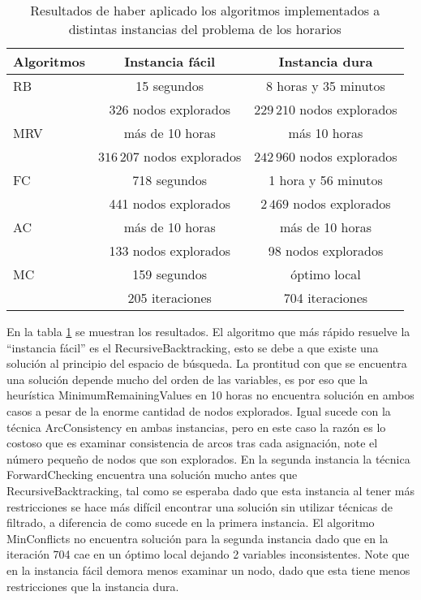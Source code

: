 \begin{table}[h]
	\caption{Resultados de haber aplicado los algoritmos implementados a distintas instancias del problema de los horarios}
	\begin{center}
		\label{1semana}
		\begin{tabular}{|l|c|c||}
			\hline \hline
			Algoritmos & Instancia f\'acil & Instancia dura \\ \hline
			RB & 15 segundos & 8 horas y 35 minutos \\
			 & 326 nodos explorados & $229\,210$ nodos explorados \\ \hline
			MRV & m\'as de 10 horas &  m\'as 10 horas \\
			 & $316\,207$ nodos explorados & $242\,960$ nodos explorados \\ \hline
			FC & 718 segundos & 1 hora y 56 minutos \\
			 & 441 nodos explorados & $2\,469$ nodos explorados \\ \hline
			AC & m\'as de 10 horas &  m\'as de 10 horas \\
			 & 133 nodos explorados & 98 nodos explorados \\ \hline
			MC & 159 segundos & \'optimo local \\
			 & 205 iteraciones & 704 iteraciones \\ \hline
		\end{tabular}
	\end{center}
\end{table}

En la tabla \ref{1semana} se muestran los resultados. El algoritmo que m\'as r\'apido resuelve la ``instancia f\'acil'' es el \textsf{RecursiveBacktracking}, esto se debe a que existe una soluci\'on al principio del espacio de b\'usqueda. La prontitud con que se encuentra una soluci\'on depende mucho del orden de las variables, es por eso que la heur\'istica \textsf{MinimumRemainingValues} en 10 horas no encuentra soluci\'on en ambos casos a pesar de la enorme cantidad de nodos explorados. Igual sucede con la t\'ecnica \textsf{ArcConsistency} en ambas instancias, pero en este caso la raz\'on es lo costoso que es examinar consistencia de arcos tras cada asignaci\'on, note el n\'umero pequeño de nodos que son explorados. En la segunda instancia la t\'ecnica \textsf{ForwardChecking} encuentra una soluci\'on mucho antes que \textsf{RecursiveBacktracking}, tal como se esperaba dado que esta instancia al tener m\'as restricciones se hace m\'as dif\'icil encontrar una soluci\'on sin utilizar t\'ecnicas de filtrado, a diferencia de como sucede en la primera instancia. El algoritmo \textsf{MinConflicts} no encuentra soluci\'on para la segunda instancia dado que en la iteraci\'on 704 cae en un \'optimo local dejando 2 variables inconsistentes. Note que en la instancia f\'acil demora menos examinar un nodo, dado que esta tiene menos restricciones que la instancia dura.

